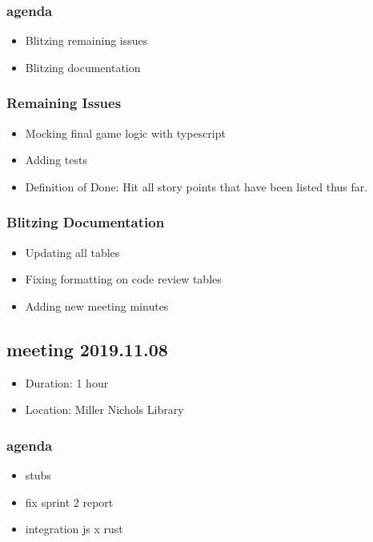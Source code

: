 \documentclass[11pt]{article}
\begin{document}
\subsubsection*{agenda}
\label{sec:orge4b6d7b}
\begin{itemize}
\item Blitzing remaining issues
\item Blitzing documentation
\end{itemize}
\subsubsection*{Remaining Issues}
\label{sec:org99b1c08}
\begin{itemize}
\item Mocking final game logic with typescript
\item Adding tests
\item Definition of Done: Hit all story points that have been listed thus far.
\end{itemize}
\subsubsection*{Blitzing Documentation}
\label{sec:org05ca60a}
\begin{itemize}
\item Updating all tables
\item Fixing formatting on code review tables
\item Adding new meeting minutes
\end{itemize}
\subsection{meeting 2019.11.08}
\label{sec:orgd6ce159}
\begin{itemize}
\item Duration: 1 hour
\item Location: Miller Nichols Library
\end{itemize}
\subsubsection{agenda}
\label{sec:org1418228}
\begin{itemize}
\item stubs
\item fix sprint 2 report
\item integration js x rust
\end{itemize}
\end{document}
